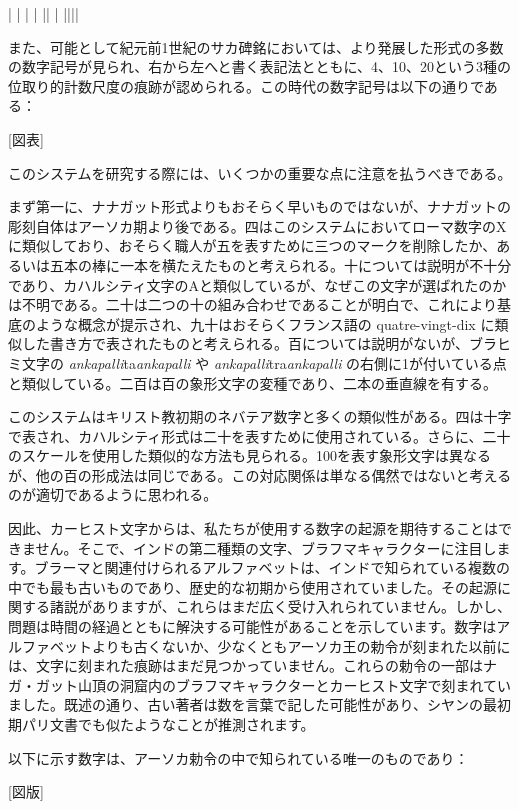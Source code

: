 \documentclass[a4paper,11pt,openany]{ltjsbook}
\begin{document}
|     |
|     |
||     |
||||

また、可能として紀元前1世紀のサカ碑銘においては、より発展した形式の多数の数字記号が見られ、右から左へと書く表記法とともに、4、10、20という3種の位取り的計数尺度の痕跡が認められる。この時代の数字記号は以下の通りである：

[図表]

このシステムを研究する際には、いくつかの重要な点に注意を払うべきである。

まず第一に、ナナガット形式よりもおそらく早いものではないが、ナナガットの彫刻自体はアーソカ期より後である。四はこのシステムにおいてローマ数字のXに類似しており、おそらく職人が五を表すために三つのマークを削除したか、あるいは五本の棒に一本を横たえたものと考えられる。十については説明が不十分であり、カハルシティ文字のAと類似しているが、なぜこの文字が選ばれたのかは不明である。二十は二つの十の組み合わせであることが明白で、これにより基底のような概念が提示され、九十はおそらくフランス語の quatre-vingt-dix に類似した書き方で表されたものと考えられる。百については説明がないが、ブラヒミ文字の \textit{ankapalli}ta\textit{ankapalli} や \textit{ankapalli}tra\textit{ankapalli} の右側に1が付いている点と類似している。二百は百の象形文字の変種であり、二本の垂直線を有する。

このシステムはキリスト教初期のネバテア数字と多くの類似性がある。四は十字で表され、カハルシティ形式は二十を表すために使用されている。さらに、二十のスケールを使用した類似的な方法も見られる。100を表す象形文字は異なるが、他の百の形成法は同じである。この対応関係は単なる偶然ではないと考えるのが適切であるように思われる。

因此、カーヒスト文字からは、私たちが使用する数字の起源を期待することはできません。そこで、インドの第二種類の文字、ブラフマキャラクターに注目します。ブラーマと関連付けられるアルファベットは、インドで知られている複数の中でも最も古いものであり、歴史的な初期から使用されていました。その起源に関する諸説がありますが、これらはまだ広く受け入れられていません。しかし、問題は時間の経過とともに解決する可能性があることを示しています。数字はアルファベットよりも古くないか、少なくともアーソカ王の勅令が刻まれた以前には、文字に刻まれた痕跡はまだ見つかっていません。これらの勅令の一部はナガ・ガット山頂の洞窟内のブラフマキャラクターとカーヒスト文字で刻まれていました。既述の通り、古い著者は数を言葉で記した可能性があり、シヤンの最初期パリ文書でも似たようなことが推測されます。

以下に示す数字は、アーソカ勅令の中で知られている唯一のものであり：

[図版]
\end{document}
